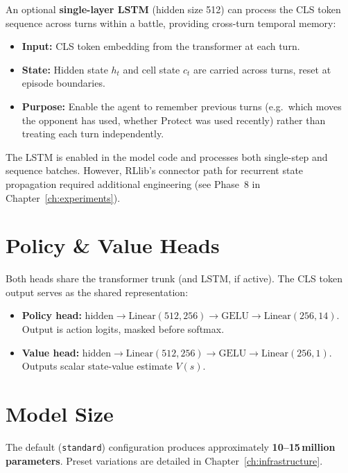 An optional \textbf{single-layer LSTM} (hidden size 512) can process the CLS
token sequence across turns within a battle, providing cross-turn temporal
memory:

\begin{itemize}
  \item \textbf{Input:} CLS token embedding from the transformer at each turn.
  \item \textbf{State:} Hidden state $h_t$ and cell state $c_t$ are carried
        across turns, reset at episode boundaries.
  \item \textbf{Purpose:} Enable the agent to remember previous turns (e.g.\
        which moves the opponent has used, whether Protect was used recently)
        rather than treating each turn independently.
\end{itemize}

The LSTM is enabled in the model code and processes both single-step and
sequence batches.  However, RLlib's connector path for recurrent state
propagation required additional engineering (see Phase~8 in
Chapter~\ref{ch:experiments}).

\section{Policy \& Value Heads}

Both heads share the transformer trunk (and LSTM, if active).  The CLS token
output serves as the shared representation:

\begin{itemize}
  \item \textbf{Policy head:} $\text{hidden} \to \text{Linear}(512, 256) \to
        \text{GELU} \to \text{Linear}(256, 14)$.  Output is action logits,
        masked before softmax.
  \item \textbf{Value head:} $\text{hidden} \to \text{Linear}(512, 256) \to
        \text{GELU} \to \text{Linear}(256, 1)$.  Outputs scalar state-value
        estimate $V(s)$.
\end{itemize}

\section{Model Size}

The default (\texttt{standard}) configuration produces approximately
\textbf{10--15\,million parameters}.  Preset variations are detailed in
Chapter~\ref{ch:infrastructure}.

